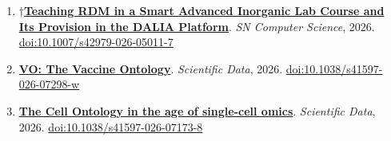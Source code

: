 \documentclass[10pt,a4paper,sans]{moderncv} %
\newcommand{\wikidata}[2]{\href{https://bioregistry.io/wikidata:#1?provider=scholia}{{#2}}}
\begin{document}
    \begin{enumerate}
    \setcounter{enumi}{0}
    \itemsep0.5em
        \item
        $\dagger$\wikidata{Q139986539}{\textbf{Teaching RDM in a Smart Advanced Inorganic Lab Course and Its Provision in the DALIA Platform}}.
    \textit{SN Computer Science}, 2026.  {\scriptsize \href{https://bioregistry.io/doi:10.1007/S42979-026-05011-7}{doi:10.1007/s42979-026-05011-7}}
        \item
        \wikidata{Q139986544}{\textbf{VO: The Vaccine Ontology}}.
    \textit{Scientific Data}, 2026.  {\scriptsize \href{https://bioregistry.io/doi:10.1038/S41597-026-07298-W}{doi:10.1038/s41597-026-07298-w}}
        \item
        \wikidata{Q139986876}{\textbf{The Cell Ontology in the age of single-cell omics}}.
    \textit{Scientific Data}, 2026.  {\scriptsize \href{https://bioregistry.io/doi:10.1038/S41597-026-07173-8}{doi:10.1038/s41597-026-07173-8}}
    \end{enumerate}
\end{document}
